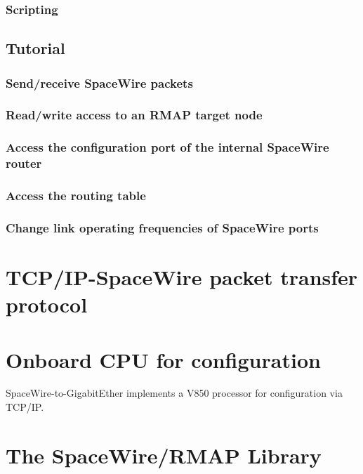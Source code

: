 \documentclass[a4paper,10pt]{article}
\begin{document}
\subsection{Scripting}

\section{Tutorial}
\subsection{Send/receive SpaceWire packets}
\subsection{Read/write access to an RMAP target node}
\subsection{Access the configuration port of the internal SpaceWire router}
\subsection{Access the routing table}
\subsection{Change link operating frequencies of SpaceWire ports}

\appendix
\chapter{TCP/IP-SpaceWire packet transfer protocol}
\chapter{Onboard CPU for configuration}
SpaceWire-to-GigabitEther implements a V850 processor for configuration via TCP/IP. 
\chapter{The SpaceWire/RMAP Library}
\end{document}
